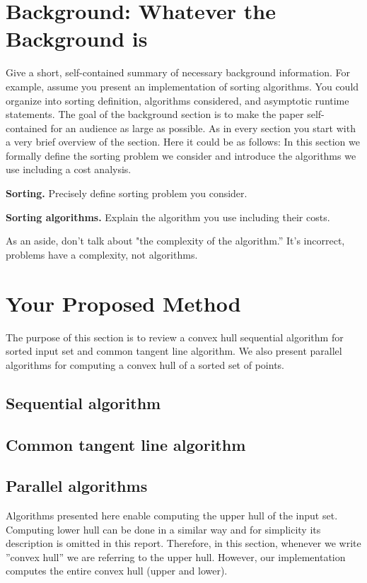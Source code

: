 \documentclass[letterpaper]{article}
\newcommand{\mypar}[1]{{\bf #1.}}
\theoremstyle{definition}
\begin{document}
\section{Background: Whatever the Background is}\label{sec:background}

Give a short, self-contained summary of necessary
background information. For example, assume you present an
implementation of sorting algorithms. You could organize into sorting
definition, algorithms considered, and asymptotic runtime statements. The goal of the
background section is to make the paper self-contained for an audience
as large as possible. As in every section
you start with a very brief overview of the section. Here it could be as follows: In this section 
we formally define the sorting problem we consider and introduce the algorithms we use
including a cost analysis.

\mypar{Sorting}
Precisely define sorting problem you consider.

\mypar{Sorting algorithms}
Explain the algorithm you use including their costs.

As an aside, don't talk about "the complexity of the algorithm.'' It's incorrect,
problems have a complexity, not algorithms.

\fi


\section{Your Proposed Method}\label{sec:yourmethod}

The purpose of this section is to review a convex hull sequential algorithm for sorted input set and common tangent line algorithm. We also present parallel algorithms for computing a convex hull of a sorted set of points.

\subsection{Sequential algorithm}

\subsection{Common tangent line algorithm}

\subsection{Parallel algorithms}

Algorithms presented here enable computing the upper hull of the input set. 
Computing lower hull can be done in a similar way and for simplicity its description is omitted in this report. 
Therefore, in this section, whenever we write ''convex hull'' we are referring to the upper hull.
However, our implementation computes the entire convex hull (upper and lower).  
\end{document}
